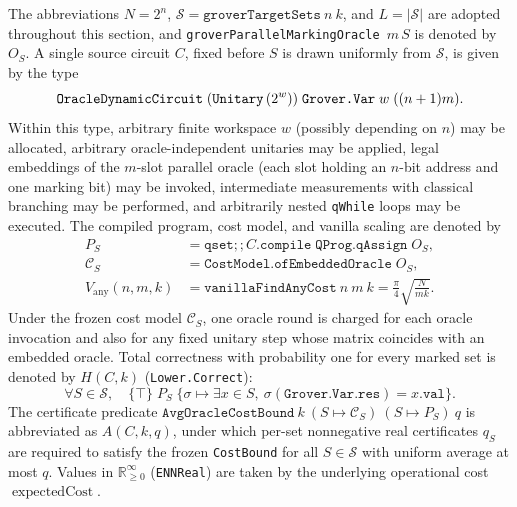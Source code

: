 \documentclass[11pt,a4paper]{article}
\theoremstyle{definition}
\theoremstyle{remark}
\begin{document}
The abbreviations \(N = 2^n\), \(\mathcal{S} = \texttt{groverTargetSets}\ n\ k\), and \(L = |\mathcal{S}|\) are adopted throughout this section, and \texttt{grover\allowbreak Parallel\allowbreak Marking\allowbreak Oracle}~\(m\,S\) is denoted by \(O_S\). A single source circuit \(C\), fixed before \(S\) is drawn uniformly from \(\mathcal{S}\), is given by the type
\[
  \texttt{OracleDynamic\allowbreak Circuit}\;(\texttt{Unitary}\,(2^w))\;\texttt{Grover.Var}\;w\;((n+1)m).
\]
Within this type, arbitrary finite workspace \(w\) (possibly depending on \(n\)) may be allocated, arbitrary oracle-independent unitaries may be applied, legal embeddings of the \(m\)-slot parallel oracle (each slot holding an \(n\)-bit address and one marking bit) may be invoked, intermediate measurements with classical branching may be performed, and arbitrarily nested \texttt{qWhile} loops may be executed. The compiled program, cost model, and vanilla scaling are denoted by
\[
  \begin{aligned}
  P_S &= \texttt{qset}\mathbin{;;} C.\texttt{compile}\;\texttt{QProg.qAssign}\;O_S, \\
  \mathcal{C}_S &= \texttt{CostModel.ofEmbeddedOracle}\;O_S, \\
  V_{\mathrm{any}}(n,m,k) &= \texttt{vanillaFindAnyCost}\ n\ m\ k = \frac{\pi}{4}\sqrt{\frac{N}{mk}}.
  \end{aligned}
\]
Under the frozen cost model \(\mathcal{C}_S\), one oracle round is charged for each oracle invocation and also for any fixed unitary step whose matrix coincides with an embedded oracle. Total correctness with probability one for every marked set is denoted by \(H(C,k)\) (\texttt{Lower.Correct}):
\[
  \forall S \in \mathcal{S},\quad \{\top\}\;P_S\;\{\sigma \mapsto \exists x \in S,\ \sigma(\texttt{Grover.Var.res}) = x.\texttt{val}\}.
\]
The certificate predicate \(\texttt{AvgOracleCostBound}\ k\ (S \mapsto \mathcal{C}_S)\ (S \mapsto P_S)\ q\) is abbreviated as \(A(C,k,q)\), under which per-set nonnegative real certificates \(q_S\) are required to satisfy the frozen \texttt{CostBound} for all \(S \in \mathcal{S}\) with uniform average at most \(q\). Values in \(\mathbb{R}_{\ge 0}^{\infty}\) (\texttt{ENNReal}) are taken by the underlying operational cost \(\operatorname{expectedCost}\).
\end{document}
